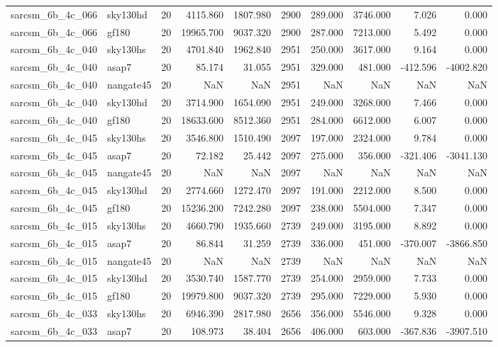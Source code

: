 \begin{tabular}{llrrrrrrrr}
sarcsm\_6b\_4c\_066 & sky130hd & 20 & 4115.860 & 1807.980 & 2900 & 289.000 & 3746.000 & 7.026 & 0.000 \\
sarcsm\_6b\_4c\_066 & gf180 & 20 & 19965.700 & 9037.320 & 2900 & 287.000 & 7213.000 & 5.492 & 0.000 \\
sarcsm\_6b\_4c\_040 & sky130hs & 20 & 4701.840 & 1962.840 & 2951 & 250.000 & 3617.000 & 9.164 & 0.000 \\
sarcsm\_6b\_4c\_040 & asap7 & 20 & 85.174 & 31.055 & 2951 & 329.000 & 481.000 & -412.596 & -4002.820 \\
sarcsm\_6b\_4c\_040 & nangate45 & 20 & NaN & NaN & 2951 & NaN & NaN & NaN & NaN \\
sarcsm\_6b\_4c\_040 & sky130hd & 20 & 3714.900 & 1654.090 & 2951 & 249.000 & 3268.000 & 7.466 & 0.000 \\
sarcsm\_6b\_4c\_040 & gf180 & 20 & 18633.600 & 8512.360 & 2951 & 284.000 & 6612.000 & 6.007 & 0.000 \\
sarcsm\_6b\_4c\_045 & sky130hs & 20 & 3546.800 & 1510.490 & 2097 & 197.000 & 2324.000 & 9.784 & 0.000 \\
sarcsm\_6b\_4c\_045 & asap7 & 20 & 72.182 & 25.442 & 2097 & 275.000 & 356.000 & -321.406 & -3041.130 \\
sarcsm\_6b\_4c\_045 & nangate45 & 20 & NaN & NaN & 2097 & NaN & NaN & NaN & NaN \\
sarcsm\_6b\_4c\_045 & sky130hd & 20 & 2774.660 & 1272.470 & 2097 & 191.000 & 2212.000 & 8.500 & 0.000 \\
sarcsm\_6b\_4c\_045 & gf180 & 20 & 15236.200 & 7242.280 & 2097 & 238.000 & 5504.000 & 7.347 & 0.000 \\
sarcsm\_6b\_4c\_015 & sky130hs & 20 & 4660.790 & 1935.660 & 2739 & 249.000 & 3195.000 & 8.892 & 0.000 \\
sarcsm\_6b\_4c\_015 & asap7 & 20 & 86.844 & 31.259 & 2739 & 336.000 & 451.000 & -370.007 & -3866.850 \\
sarcsm\_6b\_4c\_015 & nangate45 & 20 & NaN & NaN & 2739 & NaN & NaN & NaN & NaN \\
sarcsm\_6b\_4c\_015 & sky130hd & 20 & 3530.740 & 1587.770 & 2739 & 254.000 & 2959.000 & 7.733 & 0.000 \\
sarcsm\_6b\_4c\_015 & gf180 & 20 & 19979.800 & 9037.320 & 2739 & 295.000 & 7229.000 & 5.930 & 0.000 \\
sarcsm\_6b\_4c\_033 & sky130hs & 20 & 6946.390 & 2817.980 & 2656 & 356.000 & 5546.000 & 9.328 & 0.000 \\
sarcsm\_6b\_4c\_033 & asap7 & 20 & 108.973 & 38.404 & 2656 & 406.000 & 603.000 & -367.836 & -3907.510 \\

\end{tabular}
